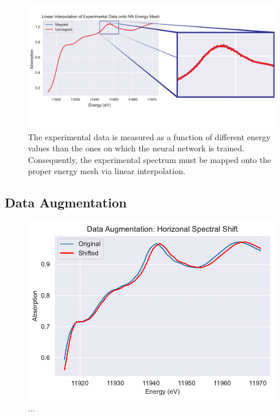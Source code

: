 \begin{figure}
    \centering
    \includegraphics[width=\linewidth]{Chapters/Figures/quality-of-interpolation-figure.pdf}
    \caption[Experimental Data Interpolation]{The experimental data is measured as a function of different energy values than the ones on which the neural network is trained. Consequently, the experimental spectrum must be mapped onto the proper energy mesh via linear interpolation.}
    \label{fig:interpolation}
\end{figure}

\subsection{Data Augmentation}

\begin{figure}
    \centering
    \includegraphics[width=\linewidth]{Chapters/Figures/data-aug-shift-pt75wieght.pdf}
    \caption[Data Augmentation: Horizontal Shift]{...}
    \label{fig:data-aug-hor}
\end{figure}
